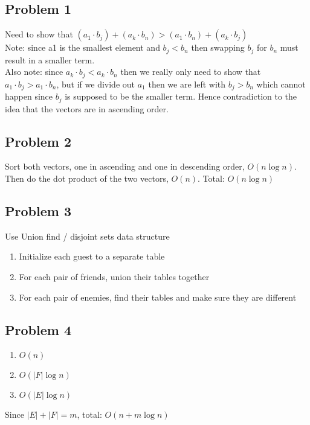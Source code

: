 \documentclass{article}
\begin{document}
\subsection*{Problem 1}
Need to show that $(a_1 \cdot b_j) + (a_k \cdot b_n) > (a_1 \cdot b_n) + (a_k \cdot b_j)$ \\

\noindent Note: since a1 is the smallest element and $b_j < b_n$ then swapping $b_j$ for $b_n$ must result in a smaller term. \\

\noindent Also note: since $a_k\cdot b_j < a_k\cdot b_n$ then we really only need to show that $a_1\cdot b_j > a_1 \cdot b_n$, but if we divide out $a_1$ then we are left with $b_j > b_n$ which cannot happen since $b_j$ is supposed to be the smaller term. Hence contradiction to the idea that the vectors are in ascending order.

\subsection*{Problem 2}
Sort both vectors, one in ascending and one in descending order, $O(n \log n)$. Then do the dot product of the two vectors, $O(n)$. Total: $O(n \log n)$

\subsection*{Problem 3}
Use Union find / disjoint sets data structure
\begin{enumerate}
    \begin{enumerate}
        \item Initialize each guest to a separate table
        \item For each pair of friends, union their tables together
        \item For each pair of enemies, find their tables and make sure they are different
    \end{enumerate}
\end{enumerate}

\subsection*{Problem 4}
\begin{enumerate}
    \begin{enumerate}
        \item $O(n)$
        \item $O(|F| \log n)$
        \item $O(|E| \log n)$
    \end{enumerate}
\end{enumerate}
Since $|E| + |F| = m$, total: $O(n + m \log n)$
\end{document}
